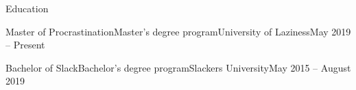 \documentclass[]{kyvernitis-resume}
\begin{document}
\resumeheader
{}
{}
{}
{}
{}

\begin{section}{Education}
    \begin{subsectionnobullet}{Master of Procrastination}{Master's degree program}{University of Laziness}{May 2019 -- Present}
    \end{subsectionnobullet}
    
    \begin{subsectionnobullet}{Bachelor of Slack}{Bachelor's degree program}{Slackers University}{May 2015 -- August 2019}
    \end{subsectionnobullet}
\end{section}
\end{document}

